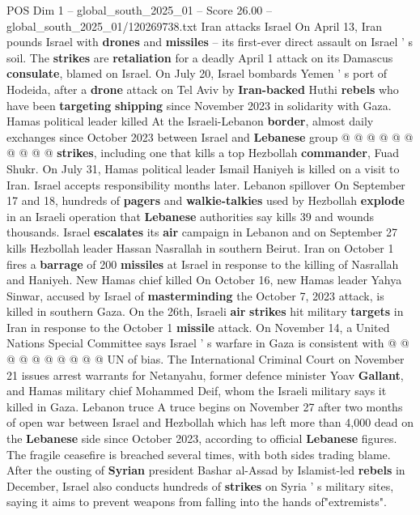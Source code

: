 \begin{textsample}{POS Dim 1 – global\_south\_2025\_01 – Score 26.00 – global\_south\_2025\_01/120269738.txt}
Iran attacks Israel On April 13, Iran pounds Israel with \textbf{drones} and \textbf{missiles} -- its first-ever direct assault on Israel ' s soil.
The \textbf{strikes} are \textbf{retaliation} for a deadly April 1 attack on its Damascus \textbf{consulate}, blamed on Israel.
On July 20, Israel bombards Yemen ' s port of Hodeida, after a \textbf{drone} attack on Tel Aviv by \textbf{Iran-backed} Huthi \textbf{rebels} who have been \textbf{targeting} \textbf{shipping} since November 2023 in solidarity with Gaza.
Hamas political leader killed At the Israeli-Lebanon \textbf{border}, almost daily exchanges since October 2023 between Israel and \textbf{Lebanese} group @ @ @ @ @ @ @ @ @ @ \textbf{strikes}, including one that kills a top Hezbollah \textbf{commander}, Fuad Shukr.
On July 31, Hamas political leader Ismail Haniyeh is killed on a visit to Iran.
Israel accepts responsibility months later.
Lebanon spillover On September 17 and 18, hundreds of \textbf{pagers} and \textbf{walkie-talkies} used by Hezbollah \textbf{explode} in an Israeli operation that \textbf{Lebanese} authorities say kills 39 and wounds thousands.
Israel \textbf{escalates} its \textbf{air} campaign in Lebanon and on September 27 kills Hezbollah leader Hassan Nasrallah in southern Beirut.
Iran on October 1 fires a \textbf{barrage} of 200 \textbf{missiles} at Israel in response to the killing of Nasrallah and Haniyeh.
New Hamas chief killed On October 16, new Hamas leader Yahya Sinwar, accused by Israel of \textbf{masterminding} the October 7, 2023 attack, is killed in southern Gaza.
On the 26th, Israeli \textbf{air} \textbf{strikes} hit military \textbf{targets} in Iran in response to the October 1 \textbf{missile} attack.
On November 14, a United Nations Special Committee says Israel ' s warfare in Gaza is consistent with @ @ @ @ @ @ @ @ @ @ UN of bias.
The International Criminal Court on November 21 issues arrest warrants for Netanyahu, former defence minister Yoav \textbf{Gallant}, and Hamas military chief Mohammed Deif, whom the Israeli military says it killed in Gaza.
Lebanon truce A truce begins on November 27 after two months of open war between Israel and Hezbollah which has left more than 4,000 dead on the \textbf{Lebanese} side since October 2023, according to official \textbf{Lebanese} figures.
The fragile ceasefire is breached several times, with both sides trading blame.
After the ousting of \textbf{Syrian} president Bashar al-Assad by Islamist-led \textbf{rebels} in December, Israel also conducts hundreds of \textbf{strikes} on Syria ' s military sites, saying it aims to prevent weapons from falling into the hands of"extremists".

\end{textsample}
